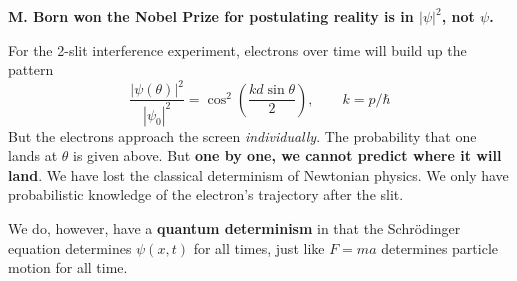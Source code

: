 \documentclass[11pt]{report}
\begin{document}
\textbf{M. Born won the Nobel Prize for postulating reality is in $|\psi|^2$, not $\psi$.}

For the 2-slit interference experiment, electrons over time will build up the pattern
\begin{equation}
\frac{|\psi(\theta)|^2}{|\psi_0|^2} = \cos^2\!\left(\frac{kd\sin\theta}{2}\right), \qquad k = p/\hbar
\end{equation}
But the electrons approach the screen \emph{individually}. The probability that one lands at $\theta$ is given above. But \textbf{one by one, we cannot predict where it will land}. We have lost the classical determinism of Newtonian physics. We only have probabilistic knowledge of the electron's trajectory after the slit.

We do, however, have a \textbf{quantum determinism} in that the Schr\"odinger equation determines $\psi(x,t)$ for all times, just like $F = ma$ determines particle motion for all time.
\end{document}
